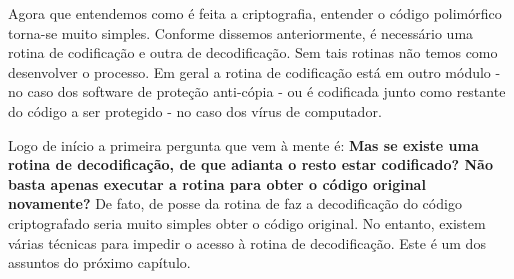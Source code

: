 Agora que entendemos como é feita a criptografia, entender o código polimórfico torna-se muito simples. Conforme dissemos anteriormente, é necessário uma rotina de codificação e outra de decodificação. Sem tais rotinas não temos como desenvolver o processo. Em geral a rotina de codificação está em outro módulo - no caso dos software de proteção anti-cópia - ou é codificada junto como restante do código a ser protegido - no caso dos vírus de computador.

Logo de início a primeira pergunta que vem à mente é: \textbf{Mas se existe uma rotina de decodificação, de que adianta o resto estar codificado? Não basta apenas executar a rotina para obter o código original novamente?} De fato, de posse da rotina de faz a decodificação do código criptografado seria muito simples obter o código original. No entanto, existem várias técnicas para impedir o acesso à rotina de decodificação. Este é um dos assuntos do próximo capítulo.

